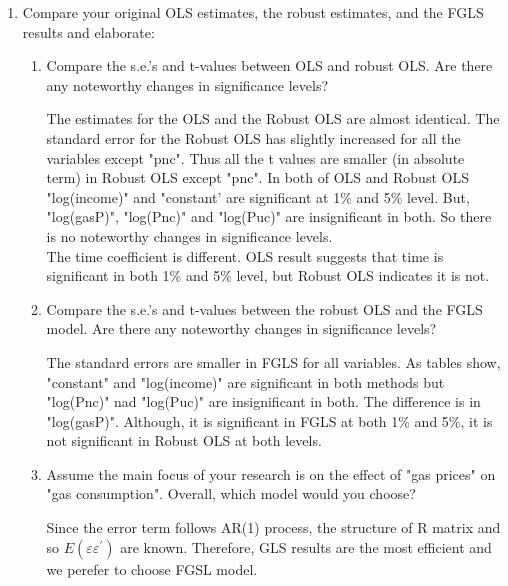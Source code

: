 \documentclass[11pt,reqno]{amsart}\usepackage[]{graphicx}\usepackage[]{color}
\newcommand{\ksp}{\vspace{0.1in}}   %
\newcommand{\kt}{^{\prime}}
\begin{document}
\begin{enumerate}
\item
Compare your original OLS estimates, the robust estimates, and the FGLS results and elaborate: \\
    \begin{enumerate}
      \item 	Compare the s.e.'s and t-values between OLS and robust OLS. Are there any noteworthy changes in significance levels? 
      \ksp
      
      The estimates for the OLS and the Robust OLS are almost identical. The standard error for the Robust OLS has slightly increased for all the variables except "pnc". Thus all the t values are smaller (in absolute term) in Robust OLS except "pnc". In both of OLS and Robust OLS "log(income)" and "constant'  are significant at 1\%  and 5\% level. But, "log(gasP)", "log(Pnc)" and "log(Puc)" are insignificant in both. So there is no noteworthy changes in significance levels.\\
The time coefficient is different. OLS result suggests that time is significant in both 1\% and 5\% level, but Robust OLS indicates it is not.

\ksp

      \item	Compare the s.e.'s and t-values between the robust OLS and the FGLS model. Are there any noteworthy changes in significance levels?  
      \ksp
      
      The standard errors are smaller in FGLS for all variables. As tables show, "constant" and "log(income)" are significant in  both methods but "log(Pnc)" nad "log(Puc)" are insignificant in both. The difference is in "log(gasP)". Although, it is significant in FGLS at both 1\% and 5\%, it is not significant in Robust OLS at both levels.
      
      \ksp
      
      \item	Assume the main focus of your research is on the effect of "gas prices" on "gas consumption". Overall, which model would you choose? 
      \ksp
      
      Since the error term follows AR(1) process, the structure of R matrix and so $E({\varepsilon\varepsilon\kt})$ are known. Therefore, GLS results are the most efficient and we perefer to choose FGSL model.
      
    \end{enumerate}
\end{enumerate}


\clearpage
\newpage
\end{document}
